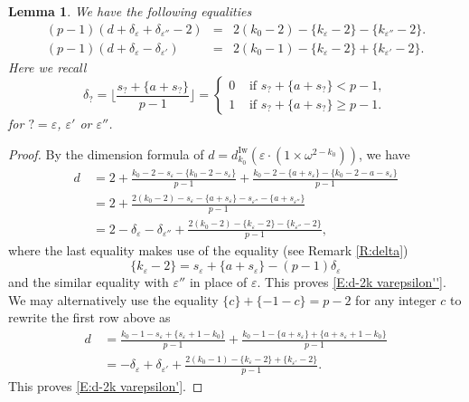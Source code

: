 \documentclass[12pt]{amsart}
\newtheorem{lemma}[subsection]{Lemma}
\theoremstyle{definition}
\numberwithin{equation}{subsection}
\newcommand{\Iw}{\mathrm{Iw}}
\begin{document}
\begin{lemma}
\label{L:d-2k} We have the following equalities
\begin{eqnarray}
\label{E:d-2k varepsilon''}
(p-1)(d + \delta_\varepsilon + \delta_{\varepsilon''}-2) &=& 2(k_0 -2)  - \{k_\varepsilon -2\} - \{k_{\varepsilon''} - 2\}.
\\
\label{E:d-2k varepsilon'}
(p-1)(d + \delta_\varepsilon - \delta_{\varepsilon'}) &=& 2(k_0-1) - \{k_\varepsilon - 2\} + \{k_{\varepsilon'}-2\}.
\end{eqnarray}
Here we recall
$$
\delta_? = \Big\lfloor \frac{s_? + \{a+s_?\}}{p-1}\Big \rfloor = \begin{cases}
0 & \textrm{ if }s_? + \{a+s_?\} < p-1,\\
1 & \textrm{ if }s_? + \{a+s_?\} \geq p-1.
\end{cases}
$$
for $?=\varepsilon$, $\varepsilon'$ or $\varepsilon''$.
\end{lemma}
\begin{proof}
By the dimension formula of $d = d_{k_0}^{\Iw}(\varepsilon \cdot(1\times \omega^{2-k_0}))$, we have
\begin{align*}
d\, &=2+ \frac{k_0-2-s_\varepsilon-\{k_0-2-s_\varepsilon\}}{p-1} + \frac{k_0-2-\{a+s_\varepsilon\}-\{k_0-2-a-s_\varepsilon\}}{p-1}
\\
& = 2 + \frac{2(k_0-2) - s_\varepsilon - \{a+s_\varepsilon\} -s_{\varepsilon''} -  \{a+s_{\varepsilon''}\}}{p-1}
\\
& = 2-\delta_\varepsilon -\delta_{\varepsilon''}+ \frac{2(k_0-2) - \{k_\varepsilon -2\} - \{k_{\varepsilon''} - 2\}}{p-1},
\end{align*}
where the last equality makes use of the equality (see Remark \ref{R:delta})
\begin{equation}
\label{E:k-delta}
\{k_\varepsilon - 2\} = s_\varepsilon + \{a+s_\varepsilon\} - (p-1)\delta_\varepsilon
\end{equation} 
and the similar equality with $\varepsilon''$ in place of $\varepsilon$. This proves \eqref{E:d-2k varepsilon''}.
We may alternatively use the equality $\{c\} + \{-1-c\} = p-2$ for any integer $c$ to rewrite the first row above as
\begin{align*}
d\, &= \frac{k_0-1-s_\varepsilon+\{s_\varepsilon+1-k_0\}}{p-1} + \frac{k_0-1-\{a+s_\varepsilon\}+\{a+s_\varepsilon+1-k_0\}}{p-1}
\\
& = - \delta_{\varepsilon} + \delta_{\varepsilon'} + \frac{2(k_0-1) -\{k_\varepsilon -2\} +\{k_{\varepsilon'} - 2\}}{p-1}.
\end{align*}
This proves \eqref{E:d-2k varepsilon'}.
\end{proof}
\end{document}
